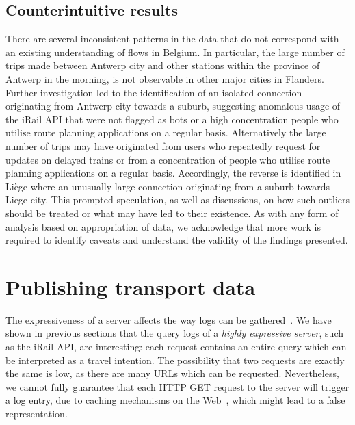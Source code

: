 \documentclass{sig-alternate}
\begin{document}
\subsection{Counterintuitive results}

There are several inconsistent patterns in the data that do not correspond with an existing understanding of flows in Belgium.
In particular, the large number of trips made between Antwerp city and other stations within the province of Antwerp in the morning, is not observable in other major cities in Flanders.
Further investigation led to the identification of an isolated connection originating from Antwerp city towards a suburb, suggesting anomalous usage of the iRail API that were not flagged as bots or a high concentration people who utilise route planning applications on a regular basis.
Alternatively the large number of trips may have originated from users who repeatedly request for updates on delayed trains or from a concentration of people who utilise route planning applications on a regular basis.
Accordingly, the reverse is identified in Liège where an unusually large connection originating from a suburb towards Liege city.
This prompted speculation, as well as discussions, on how such outliers should be treated or what may have led to their existence.
As with any form of analysis based on appropriation of data, we acknowledge that more work is required to identify caveats and understand the validity of the findings presented.

\section{Publishing transport data}
\label{sec:publishing}



The expressiveness of a server affects the way logs can be gathered~\cite{usewod2015}.
We have shown in previous sections that the query logs of a \emph{highly expressive server}, such as the iRail API, are interesting: each request contains an entire query which can be interpreted as a travel intention.
The possibility that two requests are exactly the same is low, as there are many URLs which can be requested.
Nevertheless, we cannot fully guarantee that each HTTP GET request to the server will trigger a log entry, due to caching mechanisms on the Web~\cite{fielding}, which might lead to a false representation.
\end{document}
